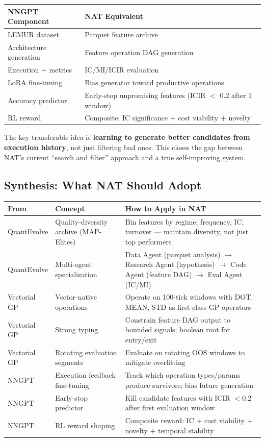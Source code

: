 \documentclass[11pt,a4paper]{article}
\begin{document}
\begin{center}
\begin{tabular}{l l}
\hline
\textbf{NNGPT Component} & \textbf{NAT Equivalent} \\
\hline
LEMUR dataset & Parquet feature archive \\
Architecture generation & Feature operation DAG generation \\
Execution + metrics & IC/MI/ICIR evaluation \\
LoRA fine-tuning & Bias generator toward productive operations \\
Accuracy predictor & Early-stop unpromising features (ICIR $<$ 0.2 after 1 window) \\
RL reward & Composite: IC significance + cost viability + novelty \\
\hline
\end{tabular}
\end{center}

The key transferable idea is \textbf{learning to generate better candidates from execution history}, not just filtering bad ones. This closes the gap between NAT's current ``search and filter'' approach and a true self-improving system.


\subsection{Synthesis: What NAT Should Adopt}

\begin{center}
\begin{tabular}{l p{4cm} p{5cm}}
\hline
\textbf{From} & \textbf{Concept} & \textbf{How to Apply in NAT} \\
\hline
QuantEvolve & Quality-diversity archive (MAP-Elites) & Bin features by regime, frequency, IC, turnover --- maintain diversity, not just top performers \\
QuantEvolve & Multi-agent specialization & Data Agent (parquet analysis) $\to$ Research Agent (hypothesis) $\to$ Code Agent (feature DAG) $\to$ Eval Agent (IC/MI) \\
Vectorial GP & Vector-native operations & Operate on 100-tick windows with DOT, MEAN, STD as first-class GP operators \\
Vectorial GP & Strong typing & Constrain feature DAG output to bounded signals; boolean root for entry/exit \\
Vectorial GP & Rotating evaluation segments & Evaluate on rotating OOS windows to mitigate overfitting \\
NNGPT & Execution feedback fine-tuning & Track which operation types/params produce survivors; bias future generation \\
NNGPT & Early-stop predictor & Kill candidate features with ICIR $< 0.2$ after first evaluation window \\
NNGPT & RL reward shaping & Composite reward: IC + cost viability + novelty + temporal stability \\
\hline
\end{tabular}
\end{center}
\end{document}
